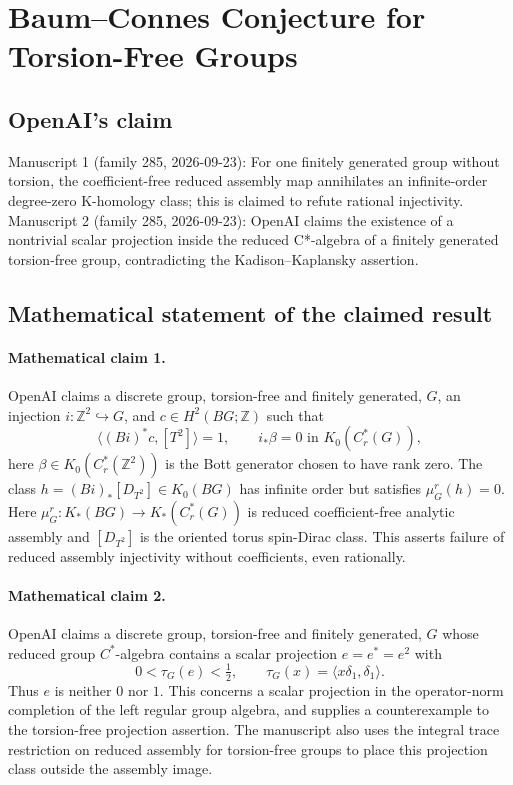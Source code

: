 \documentclass[11pt]{article}
\begin{document}
\section*{Baum–Connes Conjecture for Torsion-Free Groups}

\subsection{OpenAI's claim}
Manuscript 1 (family 285, 2026-09-23): For one finitely generated group without torsion, the coefficient-free reduced assembly map annihilates an infinite-order degree-zero K-homology class; this is claimed to refute rational injectivity. Manuscript 2 (family 285, 2026-09-23): OpenAI claims the existence of a nontrivial scalar projection inside the reduced C*-algebra of a finitely generated torsion-free group, contradicting the Kadison--Kaplansky assertion.

\subsection{Mathematical statement of the claimed result}
\paragraph{Mathematical claim 1.} OpenAI claims a discrete group, torsion-free and finitely generated, $G$, an injection $i:\mathbb Z^2\hookrightarrow G$, and $c\in H^2(BG;\mathbb Z)$ such that
\[
\langle(Bi)^*c,[T^2]\rangle=1,\qquad
 i_*\beta=0\text{ in }K_0(C_r^*(G)),
\]
here $\beta\in K_0(C_r^*(\mathbb Z^2))$ is the Bott generator chosen to have rank zero. The class $h=(Bi)_*[D_{T^2}]\in K_0(BG)$ has infinite order but satisfies $\mu_G^r(h)=0$. Here $\mu_G^r:K_*(BG)\to K_*(C_r^*(G))$ is reduced coefficient-free analytic assembly and $[D_{T^2}]$ is the oriented torus spin-Dirac class. This asserts failure of reduced assembly injectivity without coefficients, even rationally.

\paragraph{Mathematical claim 2.} OpenAI claims a discrete group, torsion-free and finitely generated, $G$ whose reduced group $C^*$-algebra contains a scalar projection $e=e^*=e^2$ with
\[
0<\tau_G(e)<\tfrac12,\qquad\tau_G(x)=\langle x\delta_1,\delta_1\rangle.
\]
Thus $e$ is neither $0$ nor $1$. This concerns a scalar projection in the operator-norm completion of the left regular group algebra, and supplies a counterexample to the torsion-free projection assertion. The manuscript also uses the integral trace restriction on reduced assembly for torsion-free groups to place this projection class outside the assembly image.
\end{document}
